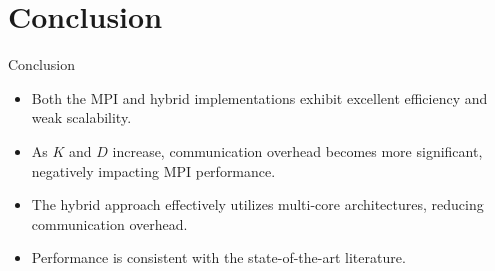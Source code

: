\section{Conclusion}
    \begin{frame}{Conclusion}
        \begin{itemize}
            \item Both the MPI and hybrid implementations exhibit excellent efficiency and weak scalability.
            \item As $K$ and $D$ increase, communication overhead becomes more significant, negatively impacting MPI performance.
            \item The hybrid approach effectively utilizes multi-core architectures, reducing communication overhead.
            \item Performance is consistent with the state-of-the-art literature.
        \end{itemize}
    \end{frame}